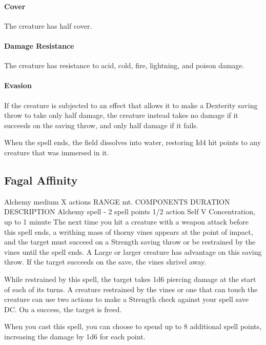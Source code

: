         \paragraph{Cover}
        The creature has half cover.
        \paragraph{Damage Resistance}
        The creature has resistance to acid, cold, fire, lightning, and poison damage.
        \paragraph{Evasion}
        If the creature is subjected to an effect that allows it to make a Dexterity saving throw to take only half damage, the creature instead takes no damage if it succeeds on the saving throw, and only half damage if it fails.

        When the spell ends, the field dissolves into water, restoring Id4 hit points to any creature that was immersed in it.
\subsection*{Fagal Affinity}
        {Alchemy medium}
        {X actions}
        {RANGE mt.}
        {COMPONENTS}
        {DURATION}
        DESCRIPTION
        {Alchemy spell - 2 spell points}
        {1/2 action}
        {Self}
        {V}
        {Concentration, up to 1 minute}
        The next time you hit a creature with a weapon attack before this spell ends, a writhing mass of thorny vines appears at the point of impact, and the target must succeed on a Strength saving throw or be restrained by the vines until the spell ends.
        A Large or larger creature has advantage on this saving throw.
        If the target succeeds on the save, the vines shrivel away.

        While restrained by this spell, the target takes 1d6 piercing damage at the start of each of its turns.
        A creature restrained by the vines or one that can touch the creature can use two actions to make a Strength check against your spell save DC.
        On a success, the target is freed.

        When you cast this spell, you can choose to spend up to 8 additional spell points, increasing the damage by 1d6 for each point.

